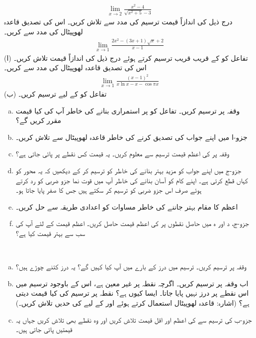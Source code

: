 \begin{align*}
\lim_{x\to2}\frac{x^2-4}{\sqrt{x^2+5}-3}
\end{align*} 
درج ذیل کی اندازاً قیمت ترسیم کی مدد سے تلاش کریں۔ اس کی تصدیق قاعدہ لھوپیٹال کی مدد سے کریں۔
\begin{align*}
\lim_{x\to1}\frac{2x^2-(3x+1)\sqrt{x}+2}{x-1}
\end{align*} 
(ا) تفاعل    کو  کے قریب قریب ترسیم کرتے ہوئے درج ذیل کی اندازاً قیمت تلاش کریں۔ اس کی تصدیق قاعدہ لھوپیٹال کی مدد سے کریں۔
\begin{align*}
\lim_{x\to1}\frac{(x-1)^2}{x\ln x-x-\cos \pi x}
\end{align*} 
(ب) تفاعل  کو  کے لیے ترسیم کریں۔
\\
\begin{enumerate}[a.]
\item
وقفہ  پر  ترسیم کریں۔ تفاعل  کو  پر استمراری بنانے کی خاطر آپ  کی کیا قیمت مقرر کریں گے؟ 
\item
جزو-ا میں اپنے جواب کی تصدیق کرنے کی خاطر قاعدہ لھوپیٹال سے  تلاش کریں۔
\item
وقفہ  پر  کی اعظم قیمت ترسیم سے معلوم کریں۔ یہ قیمت کس نقطے  پر پائی جاتی ہے؟
\item
جزو-ج میں اپنے جواب کو مزید بہتر بنانے کی خاطر  کو ترسیم کر کے دیکھیں کہ یہ محور  کو کہاں قطع کرتی ہے۔ اپنے کام کو آسان بنانے کی خاطر آپ  میں قوت نما جزو ضربی  کو رد کرتے ہوئے صرف اس  جزو ضربی  کو ترسیم کر سکتے ہیں جس کا صفر پایا جاتا ہو۔
\item
اعظم  کا مقام بہتر جاننے کی خاطر مساوات  کو اعدادی طریقہ سے حل کریں۔
\item
جزو-ج، د اور ہ میں حاصل نقطوں پر  کی اعظم قیمت  حاصل کریں۔ اعظم قیمت کے لئے آپ کی  سب سے بہتر   قیمت کیا ہے؟
\end{enumerate}
\\
\begin{enumerate}[a.]
\item
وقفہ  پر  ترسیم کریں۔ ترسیم میں درز کے بارے میں آپ کیا کہیں گے؟ یہ درز کتنے چوڑے ہیں؟
\item
اب وقفہ  پر  ترسیم کریں۔ اگرچہ نقطہ  پر   غیر معین  ہے،  اس کے باوجود ترسیم میں اس نقطے  پر درز نہیں پایا جاتا۔ ایسا کیوں ہے؟ نقطہ  پر ترسیم  کی کیا قیمت دیتی ہے؟ (اشارہ:  قاعدہ لھوپیٹال استعمال کرتے ہوئے  اور  کے لیے  کی حدیں تلاش کریں۔)
\item
جزو-ب کی ترسیم سے  کی اعظم اور اقل قیمت تلاش کریں اور وہ نقطے بھی تلاش کریں جہاں یہ قیمتیں پائی جاتی ہیں۔
\end{enumerate}
